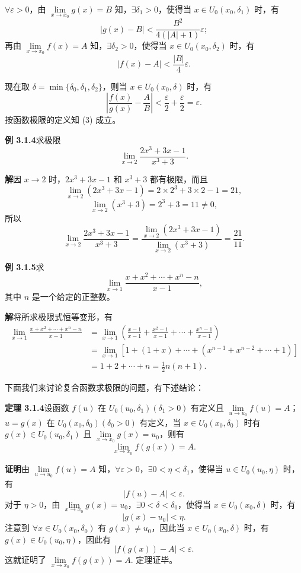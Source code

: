 \documentclass[UTF8, 12pt, fontset=fandol, oneside]{ctexart}
\begin{document}
$\forall\varepsilon>0$，由 $\lim\limits_{x\to x_0}g(x)=B$ 知，$\exists\delta_1>0$，使得当 $x\in U_0(x_0,\delta_1)$ 时，有
\[
  |g(x)-B|<\frac{B^2}{4(|A|+1)}\varepsilon;
\]
再由 $\lim\limits_{x\to x_0}f(x)=A$ 知，$\exists\delta_2>0$，使得当 $x\in U_0(x_0,\delta_2)$ 时，有
\[
  |f(x)-A|<\frac{|B|}{4}\varepsilon.
\]

现在取 $\delta=\min\{\delta_0,\delta_1,\delta_2\}$，则当 $x\in U_0(x_0,\delta)$ 时，有
\[
  \left|\frac{f(x)}{g(x)}-\frac{A}{B}\right|
  <\frac{\varepsilon}{2}+\frac{\varepsilon}{2}=\varepsilon.
\]
按函数极限的定义知 (3) 成立。

\noindent\textbf{例 3.1.4}\quad 求极限
\[
  \lim_{x\to2}\frac{2x^3+3x-1}{x^3+3}.
\]

\noindent\textbf{解}\quad 因 $x\to2$ 时，$2x^3+3x-1$ 和 $x^3+3$ 都有极限，而且
\[
  \lim_{x\to2}(2x^3+3x-1)=2\times2^3+3\times2-1=21,
\]
\[
  \lim_{x\to2}(x^3+3)=2^3+3=11\ne0,
\]
所以
\[
  \lim_{x\to2}\frac{2x^3+3x-1}{x^3+3}
  =\frac{\lim\limits_{x\to2}(2x^3+3x-1)}
  {\lim\limits_{x\to2}(x^3+3)}
  =\frac{21}{11}.
\]

\noindent\textbf{例 3.1.5}\quad 求
\[
  \lim_{x\to1}\frac{x+x^2+\cdots+x^n-n}{x-1},
\]
其中 $n$ 是一个给定的正整数。

\noindent\textbf{解}\quad 将所求极限式恒等变形，有
\[
\begin{aligned}
  \lim_{x\to1}\frac{x+x^2+\cdots+x^n-n}{x-1}
  &=\lim_{x\to1}\left(\frac{x-1}{x-1}+\frac{x^2-1}{x-1}+\cdots+\frac{x^n-1}{x-1}\right)\\
  &=\lim_{x\to1}\left[1+(1+x)+\cdots+(x^{n-1}+x^{n-2}+\cdots+1)\right]\\
  &=1+2+\cdots+n=\frac12 n(n+1).
\end{aligned}
\]

下面我们来讨论复合函数求极限的问题，有下述结论：

\noindent\textbf{定理 3.1.4}\quad 设函数 $f(u)$ 在 $U_0(u_0,\delta_1)(\delta_1>0)$ 有定义且 $\lim\limits_{u\to u_0}f(u)=A$；$u=g(x)$ 在 $U_0(x_0,\delta_0)(\delta_0>0)$ 有定义，当 $x\in U_0(x_0,\delta_0)$ 时有 $g(x)\in U_0(u_0,\delta_1)$ 且 $\lim\limits_{x\to x_0}g(x)=u_0$，则有
\[
  \lim_{x\to x_0}f(g(x))=A.
\]

\noindent\textbf{证明}\quad 由 $\lim\limits_{u\to u_0}f(u)=A$ 知，$\forall\varepsilon>0$，$\exists 0<\eta<\delta_1$，使得当 $u\in U_0(u_0,\eta)$ 时，有
\[
  |f(u)-A|<\varepsilon.
\]
对于 $\eta>0$，由 $\lim\limits_{x\to x_0}g(x)=u_0$，$\exists 0<\delta<\delta_0$，使得当 $x\in U_0(x_0,\delta)$ 时，有
\[
  |g(x)-u_0|<\eta.
\]
注意到 $\forall x\in U_0(x_0,\delta_0)$ 有 $g(x)\ne u_0$，因此当 $x\in U_0(x_0,\delta)$ 时，有 $g(x)\in U_0(u_0,\eta)$，因此有
\[
  |f(g(x))-A|<\varepsilon.
\]
这就证明了 $\lim\limits_{x\to x_0}f(g(x))=A$. 定理证毕。
\end{document}
